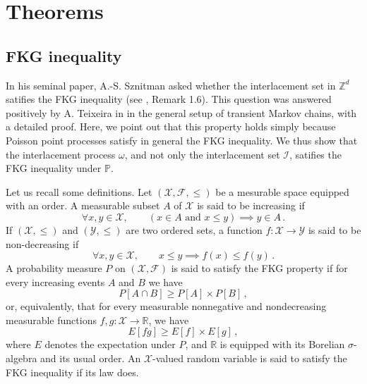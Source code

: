 \documentclass[12pt,a4paper]{article}
\newtheorem{definition}[theo]{Definition}
\newcommand{\1}[1]{{\mathbf 1}{\{#1\}}}
\newcommand{\Z}{{\mathbb Z}}
\newcommand{\R}{{\mathbb R}}
\newcommand{\I}{{\mathcal I}}
\newcommand{\8}{{\infty}}
\begin{document}
\section{Theorems}

\subsection{FKG inequality}



In his seminal paper, A.-S. Sznitman asked whether the interlacement set in $\Z^d$ satifies the FKG inequality (see \cite{Sznitman2010}, Remark 1.6). 
This question was answered positively by A. Teixeira in \cite{Teixeira2009} in the general setup of transient Markov chains, with a detailed proof. 
Here, we point out that this property holds simply because Poisson point processes satisfy in general the FKG inequality. 
We thus show that the interlacement process $\omega$, and not only the interlacement set $\I$, satifies the FKG inequality under $\mathbb{P}$.

\smallskip

Let us recall some definitions.
Let $(\mathcal{X}, \mathcal{F}, \le )$ be a mesurable space equipped with an order. 
A measurable subset $A$ of $\mathcal{X}$ is said to be increasing if 
\begin{equation}
\forall x, y  \in \mathcal{X}, \qquad  ( x \in A \text{ and } x \le y ) \implies y \in A\, .
\end{equation}
If $(\mathcal{X}, \le)$ and $(\mathcal{Y} , \le)$ are two ordered sets, a function $f: \mathcal{X} \to \mathcal{Y}$ is said to be non-decreasing if
\begin{equation}
\forall x, y \in \mathcal{X}, \qquad x \le y \implies f(x) \le f(y)\, . 
\end{equation}
A probability measure $P$ on $(\mathcal{X}, \mathcal{F})$ is said to satisfy the FKG property if for every increasing events $A$ and $B$ we have
\begin{equation}
P[A \cap B ] \ge P[A] \times P[B]\, ,
\end{equation}
or, equivalently, that for every measurable nonnegative and nondecreasing measurable functions $f, g : \mathcal{X} \to \R$, we have
\begin{equation}
E[fg] \ge E[f] \times E[g]\, ,
\end{equation}
where $E$ denotes the expectation under $P$, and $\R$ is equipped with its Borelian $\sigma$-algebra and its usual order. 
An $\mathcal{X}$-valued random variable is said to satisfy the FKG inequality if its law does.
\end{document}
